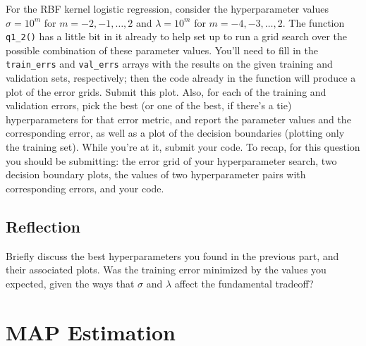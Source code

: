 \documentclass{article}
\def\blu#1{{\color{blu}#1}}
\begin{document}
For the RBF kernel logistic regression, consider the hyperparameter values $\sigma=10^m$ for $m=-2,-1,\ldots,2$ and $\lambda=10^m$ for $m=-4,-3,\ldots,2$.
The function \verb|q1_2()| has a little bit in it already to help set up to run a grid search over the possible combination of these parameter values.
You'll need to fill in the \verb|train_errs| and \verb|val_errs| arrays
with the results on the given training and validation sets, respectively;
then the code already in the function will produce a plot of the error grids.
\blu{Submit this plot}.
Also, for each of the training and validation errors,
pick the best (or one of the best, if there's a tie) hyperparameters for that error metric,
and \blu{report the parameter values and the corresponding error, as well as a plot of the decision boundaries (plotting only the training set)}.
While you're at it, \blu{submit your code}.
To recap, for this question you should be submitting:
the error grid of your hyperparameter search, two decision boundary plots,
the values of two hyperparameter pairs with corresponding errors,
and your code.

\pagebreak 

\subsection{Reflection}
\blu{Briefly discuss the best hyperparameters you found in the previous part, and their associated plots. Was the training error minimized by the values you expected, given the ways that $\sigma$ and $\lambda$ affect the fundamental tradeoff?}

\pagebreak

\section{MAP Estimation}
\end{document}
